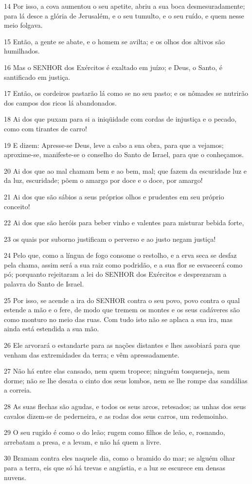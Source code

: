 \par 14 Por isso, a cova aumentou o seu apetite, abriu a sua boca desmesuradamente; para lá desce a glória de Jerusalém, e o seu tumulto, e o seu ruído, e quem nesse meio folgava.
\par 15 Então, a gente se abate, e o homem se avilta; e os olhos dos altivos são humilhados.
\par 16 Mas o SENHOR dos Exércitos é exaltado em juízo; e Deus, o Santo, é santificado em justiça.
\par 17 Então, os cordeiros pastarão lá como se no seu pasto; e os nômades se nutrirão dos campos dos ricos lá abandonados.
\par 18 Ai dos que puxam para si a iniqüidade com cordas de injustiça e o pecado, como com tirantes de carro!
\par 19 E dizem: Apresse-se Deus, leve a cabo a sua obra, para que a vejamos; aproxime-se, manifeste-se o conselho do Santo de Israel, para que o conheçamos.
\par 20 Ai dos que ao mal chamam bem e ao bem, mal; que fazem da escuridade luz e da luz, escuridade; põem o amargo por doce e o doce, por amargo!
\par 21 Ai dos que são sábios a seus próprios olhos e prudentes em seu próprio conceito!
\par 22 Ai dos que são heróis para beber vinho e valentes para misturar bebida forte,
\par 23 os quais por suborno justificam o perverso e ao justo negam justiça!
\par 24 Pelo que, como a língua de fogo consome o restolho, e a erva seca se desfaz pela chama, assim será a sua raiz como podridão, e a sua flor se esvaecerá como pó; porquanto rejeitaram a lei do SENHOR dos Exércitos e desprezaram a palavra do Santo de Israel.
\par 25 Por isso, se acende a ira do SENHOR contra o seu povo, povo contra o qual estende a mão e o fere, de modo que tremem os montes e os seus cadáveres são como monturo no meio das ruas. Com tudo isto não se aplaca a sua ira, mas ainda está estendida a sua mão.
\par 26 Ele arvorará o estandarte para as nações distantes e lhes assobiará para que venham das extremidades da terra; e vêm apressadamente.
\par 27 Não há entre elas cansado, nem quem tropece; ninguém tosqueneja, nem dorme; não se lhe desata o cinto dos seus lombos, nem se lhe rompe das sandálias a correia.
\par 28 As suas flechas são agudas, e todos os seus arcos, retesados; as unhas dos seus cavalos dizem-se de pederneira, e as rodas dos seus carros, um redemoinho.
\par 29 O seu rugido é como o do leão; rugem como filhos de leão, e, rosnando, arrebatam a presa, e a levam, e não há quem a livre.
\par 30 Bramam contra eles naquele dia, como o bramido do mar; se alguém olhar para a terra, eis que só há trevas e angústia, e a luz se escurece em densas nuvens.

